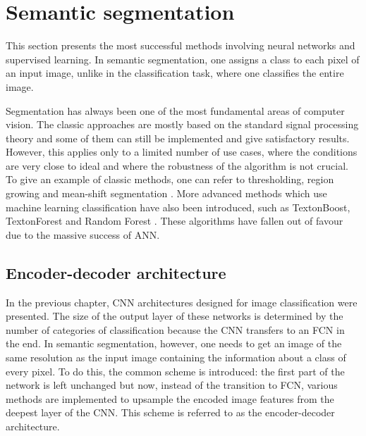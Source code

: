 \newpage
\section{Semantic segmentation}

This section presents the most successful methods involving neural networks and supervised learning. In semantic segmentation, one assigns a class to each pixel of an input image, unlike in the classification task, where one classifies the entire image. 

Segmentation has always been one of the most fundamental areas of computer vision. The classic approaches are mostly based on the standard signal processing theory and some of them can still be implemented and give satisfactory results. However, this applies only to a limited number of use cases, where the conditions are very close to ideal and where the robustness of the algorithm is not crucial. To give an example of classic methods, one can refer to thresholding, region growing and mean-shift segmentation \cite{coufal}. More advanced methods which use machine learning classification have also been introduced, such as TextonBoost, TextonForest and Random Forest \cite{segnet} \cite{bayesian}. These algorithms have fallen out of favour due to the massive success of ANN.

\subsection{Encoder-decoder architecture}

In the previous chapter, CNN architectures designed for image classification were presented. The size of the output layer of these networks is determined by the number of categories of classification because the CNN transfers to an FCN in the end. In semantic segmentation, however, one needs to get an image of the same resolution as the input image containing the information about a class of every pixel. To do this, the common scheme is introduced: the first part of the network is left unchanged but now, instead of the transition to FCN, various methods are implemented to upsample the encoded image features from the deepest layer of the CNN. This scheme is referred to as the encoder-decoder architecture. \cite{stanford-L11}

